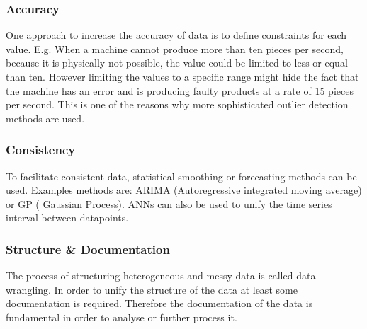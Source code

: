 \subsubsection{Accuracy}
One approach to increase the accuracy of data is to define constraints for each value. E.g. When a machine cannot produce more than ten pieces per second, because it is physically not possible, the value could be limited to less or equal than ten. However limiting the values to a specific range might hide the fact that the machine  has an error and is producing faulty products at a rate of 15 pieces per second. This is one of the reasons why more sophisticated outlier detection methods are used.\cite{songIoTDataQuality2020}

\subsubsection{Consistency}
To facilitate consistent data, statistical smoothing or forecasting methods can be used. Examples methods are: \ac{ARIMA} (Autoregressive integrated moving average) or \ac{GP} ( Gaussian Process). ANNs can also be used to unify the time series interval between datapoints. \cite{songIoTDataQuality2020}

\subsubsection{Structure \& Documentation}
The process of structuring heterogeneous and messy data is called data wrangling. In order to unify the structure of the data at least some documentation is required. Therefore the documentation of the data is fundamental in order to analyse or further process it. 